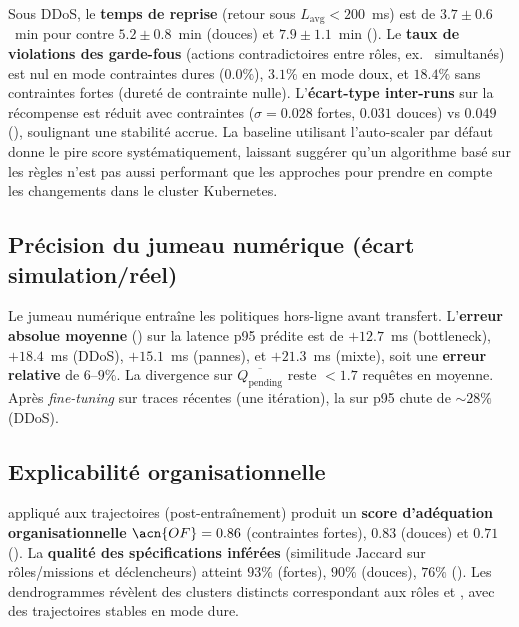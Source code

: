Sous DDoS, le \textbf{temps de reprise} (retour sous $L_{\text{avg}}<200$~ms) est de $3.7 \pm 0.6$~min pour  contre $5.2 \pm 0.8$~min (douces) et $7.9 \pm 1.1$~min ().
Le \textbf{taux de violations des garde-fous} (actions contradictoires entre rôles, ex.~ simultanés) est nul en mode contraintes dures ($0.0\%$), $3.1\%$ en mode doux, et $18.4\%$ sans contraintes fortes (dureté de contrainte nulle).
L'\textbf{écart-type inter-runs} sur la récompense est réduit avec contraintes ($\sigma=0.028$ fortes, $0.031$ douces) vs $0.049$ (), soulignant une stabilité accrue. La baseline utilisant l'auto-scaler par défaut  donne le pire score systématiquement, laissant suggérer qu'un algorithme basé sur les règles n'est pas aussi performant que les approches  pour prendre en compte les changements dans le cluster Kubernetes.

\subsection*{Précision du jumeau numérique (écart simulation/réel)}

Le jumeau numérique entraîne les politiques hors-ligne avant transfert.
L'\textbf{erreur absolue moyenne} () sur la latence p95 prédite est de $+12.7$~ms (bottleneck), $+18.4$~ms (DDoS), $+15.1$~ms (pannes), et $+21.3$~ms (mixte), soit une \textbf{erreur relative} de $6$--$9\%$.
La divergence sur $\overline{Q_{\text{pending}}}$ reste $<1.7$ requêtes en moyenne.
Après \textit{fine-tuning} sur traces récentes (une itération), la  sur p95 chute de $\sim 28\%$ (DDoS).

\subsection*{Explicabilité organisationnelle}

 appliqué aux trajectoires (post-entraînement) produit un \textbf{score d'adéquation organisationnelle} $\acn{OF}=0.86$ (contraintes fortes), $0.83$ (douces) et $0.71$ ().
La \textbf{qualité des spécifications inférées} (similitude Jaccard sur rôles/missions et déclencheurs) atteint $93\%$ (fortes), $90\%$ (douces), $76\%$ ().
Les dendrogrammes révèlent des clusters distincts correspondant aux rôles  et , avec des trajectoires stables en mode dure.

